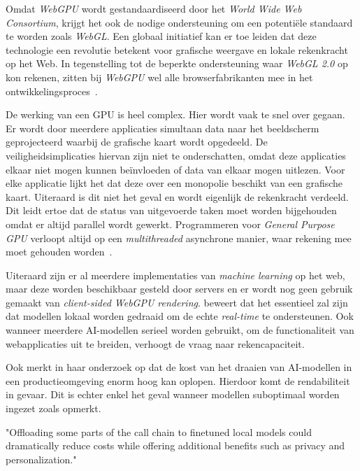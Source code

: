 Omdat \textit{WebGPU} wordt gestandaardiseerd door het \textit{World Wide Web Consortium}, krijgt het ook de nodige ondersteuning om een potentiële standaard te worden zoals \textit{WebGL}. Een globaal initiatief kan er toe leiden dat deze technologie een revolutie betekent voor grafische weergave en lokale rekenkracht op het Web. In tegenstelling tot de beperkte ondersteuning waar \textit{WebGL 2.0} op kon rekenen, zitten bij \textit{WebGPU} wel alle browserfabrikanten mee in het ontwikkelingsproces~\autocite{Surma2022}.

\bigbreak{}

De werking van een GPU is heel complex. Hier wordt vaak te snel over gegaan. Er wordt door meerdere applicaties simultaan data naar het beeldscherm geprojecteerd waarbij de grafische kaart wordt opgedeeld. De veiligheidsimplicaties hiervan zijn niet te onderschatten, omdat deze applicaties elkaar niet mogen kunnen beïnvloeden of data van elkaar mogen uitlezen. Voor elke applicatie lijkt het dat deze over een monopolie beschikt van een grafische kaart. Uiteraard is dit niet het geval en wordt eigenlijk de rekenkracht verdeeld. Dit leidt ertoe dat de status van uitgevoerde taken moet worden bijgehouden omdat er altijd parallel wordt gewerkt. Programmeren voor \textit{General Purpose GPU} verloopt altijd op een \textit{multithreaded} asynchrone manier, waar rekening mee moet gehouden worden~\autocite{Surma2022}.

\bigbreak{}

Uiteraard zijn er al meerdere implementaties van \textit{machine learning} op het web, maar deze worden beschikbaar gesteld door servers en er wordt nog geen gebruik gemaakt van \textit{client-sided \textit{WebGPU} rendering}. \textcite{Fleetwood2023a} beweert dat het essentieel zal zijn dat modellen lokaal worden gedraaid om de echte \textit{real-time} te ondersteunen. Ook wanneer meerdere AI-modellen serieel worden gebruikt, om de functionaliteit van webapplicaties uit te breiden, verhoogt de vraag naar rekencapaciteit.

\bigbreak{}

Ook \textcite{Huyen2023} merkt in haar onderzoek op dat de kost van het draaien van AI-modellen in een productieomgeving enorm hoog kan oplopen. Hierdoor komt de rendabiliteit in gevaar. Dit is echter enkel het geval wanneer modellen suboptimaal worden ingezet zoals \textcite{Fleetwood2023a} opmerkt.

\begin{displayquote}
    "Offloading some parts of the call chain to finetuned local models could dramatically reduce costs while offering additional benefits such as privacy and personalization."
\end{displayquote}

